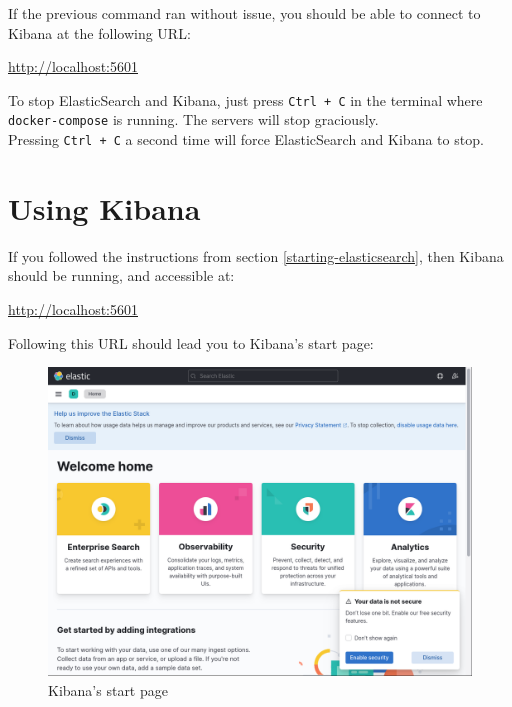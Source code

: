 \bigskip

If the previous command ran without issue, you should be able to connect to Kibana at the following URL:
\begin{center}
\url{http://localhost:5601}
\end{center}

\bigskip

To stop ElasticSearch and Kibana, just press \texttt{Ctrl + C} in the terminal where \texttt{docker-compose} is running. The servers will stop graciously. \\

Pressing \texttt{Ctrl + C} a second time will force ElasticSearch and Kibana to stop. \\



\bigskip


\section{Using Kibana}

If you followed the instructions from section \ref{starting-elasticsearch}, then Kibana should be running, and accessible at:
\begin{center}
	\url{http://localhost:5601}
\end{center}

\bigskip

Following this URL should lead you to Kibana's start page:

\begin{figure}[h]
	\centering
	\includegraphics[width=0.8\linewidth]{files/images/kibana-start-page.png}
	\caption{Kibana's start page}
	\label{fig:kibana-start-page}
\end{figure}



